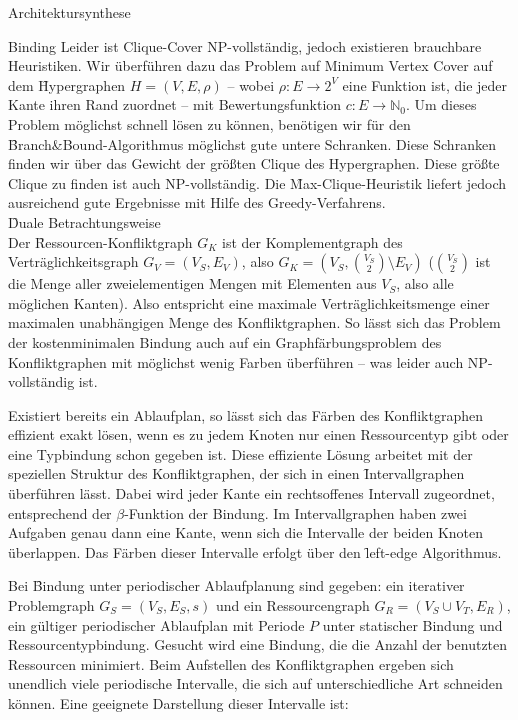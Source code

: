 \begin{chapter}{Architektursynthese}
\begin{section}{Binding}
 Leider ist Clique-Cover NP-vollständig, jedoch existieren brauchbare Heuristiken. Wir überführen dazu das Problem auf Minimum Vertex Cover auf dem \f{Hypergraphen} $H=(V,E,\rho)$ -- wobei $\rho: E \rightarrow 2^V$ eine Funktion ist, die jeder Kante ihren Rand zuordnet -- mit Bewertungsfunktion $c: E\rightarrow \mathbb{N}_0$. Um dieses Problem möglichst schnell lösen zu können, benötigen wir für den \f{Branch\&Bound}-Algorithmus möglichst gute untere Schranken. Diese Schranken finden wir über das Gewicht der größten Clique des Hypergraphen. Diese größte Clique zu finden ist auch NP-vollständig. Die \f{Max-Clique-Heuristik} liefert jedoch ausreichend gute Ergebnisse mit Hilfe des Greedy-Verfahrens. \\
 
 \f{Duale Betrachtungsweise}\\
 Der \f{Ressourcen-Konfliktgraph} $G_K$ ist der Komplementgraph des Verträglichkeitsgraph $G_V=(V_S,E_V)$, also $G_K = (V_S, \binom{V_S}{2}\setminus E_V)$ ($\binom{V_S}{2}$ ist die Menge aller zweielementigen Mengen mit Elementen aus $V_S$, also alle möglichen Kanten). Also entspricht eine maximale Verträglichkeitsmenge einer maximalen unabhängigen Menge des Konfliktgraphen. So lässt sich das Problem der kostenminimalen Bindung auch auf ein Graphfärbungsproblem des Konfliktgraphen mit möglichst wenig Farben überführen -- was leider auch NP-vollständig ist.
 
 Existiert bereits ein Ablaufplan, so lässt sich das Färben des Konfliktgraphen effizient exakt lösen, wenn es zu jedem Knoten nur einen Ressourcentyp gibt oder eine Typbindung schon gegeben ist. Diese effiziente Lösung arbeitet mit der speziellen Struktur des Konfliktgraphen, der sich in einen \f{Intervallgraphen} überführen lässt. Dabei wird jeder Kante ein rechtsoffenes Intervall zugeordnet, entsprechend der $\beta$-Funktion der Bindung. Im Intervallgraphen haben zwei Aufgaben genau dann eine Kante, wenn sich die Intervalle der beiden Knoten überlappen. Das Färben dieser Intervalle erfolgt über den \f{left-edge Algorithmus}.

 Bei \f{Bindung unter periodischer Ablaufplanung} sind gegeben: ein iterativer Problemgraph $G_S = (V_S,E_S,s)$ und ein Ressourcengraph $G_R=(V_S\cup V_T, E_R)$, ein gültiger periodischer Ablaufplan mit Periode $P$ unter statischer Bindung und Ressourcentypbindung. Gesucht wird eine Bindung, die die Anzahl der benutzten Ressourcen minimiert. Beim Aufstellen des Konfliktgraphen ergeben sich unendlich viele periodische Intervalle, die sich auf unterschiedliche Art schneiden können. Eine geeignete Darstellung dieser Intervalle ist:
 

\end{section}
\end{chapter}
